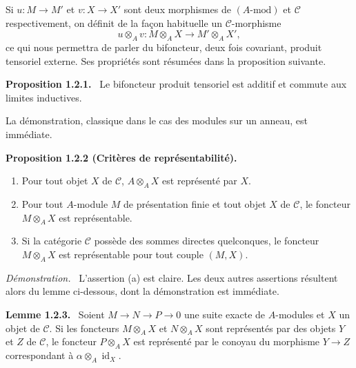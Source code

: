 \documentclass[11pt]{article}
\newenvironment{statement}[1]{\par\medskip\noindent\textbf{#1.}\ }{\par\medskip}
\newenvironment{prooftext}[1][Proof]{\par\noindent\emph{#1.}\ }{\par\medskip}
\providecommand{\id}{\operatorname{id}}
\providecommand{\cC}{\mathcal C}
\providecommand{\id}{\operatorname{id}}
\providecommand{\id}{\operatorname{id}}
\providecommand{\id}{\operatorname{id}}
\providecommand{\id}{\operatorname{id}}
\providecommand{\cC}{\mathcal C}
\providecommand{\id}{\operatorname{id}}
\begin{document}
Si $u:M\to M'$ et $v:X\to X'$ sont deux morphismes de $(A\text{-mod})$ et $\cC$ respectivement, on définit de la façon habituelle un $\cC$-morphisme
\[
u\otimes_A v:M\otimes_A X\longrightarrow M'\otimes_A X',
\]
ce qui nous permettra de parler du bifoncteur, deux fois covariant, produit tensoriel externe. Ses propriétés sont résumées dans la proposition suivante.

\begin{statement}{Proposition 1.2.1}
Le bifoncteur produit tensoriel est additif et commute aux limites inductives.
\end{statement}
La démonstration, classique dans le cas des modules sur un anneau, est immédiate.

\begin{statement}{Proposition 1.2.2 (Critères de représentabilité)}
\begin{enumerate}[label=(\alph*)]
\item Pour tout objet $X$ de $\cC$, $A\otimes_AX$ est représenté par $X$.
\item Pour tout $A$-module $M$ de présentation finie et tout objet $X$ de $\cC$, le foncteur $M\otimes_AX$ est représentable.
\item Si la catégorie $\cC$ possède des sommes directes quelconques, le foncteur $M\otimes_A X$ est représentable pour tout couple $(M,X)$.
\end{enumerate}
\end{statement}

\begin{prooftext}[Démonstration]
L'assertion (a) est claire. Les deux autres assertions résultent alors du lemme ci-dessous, dont la démonstration est immédiate.
\end{prooftext}

\begin{statement}{Lemme 1.2.3}
Soient $M\to N\to P\to0$ une suite exacte de $A$-modules et $X$ un objet de $\cC$. Si les foncteurs $M\otimes_A X$ et $N\otimes_A X$ sont représentés par des objets $Y$ et $Z$ de $\cC$, le foncteur $P\otimes_A X$ est représenté par le conoyau du morphisme $Y\to Z$ correspondant à $\alpha\otimes_A\id_X$.
\end{statement}

\end{document}
